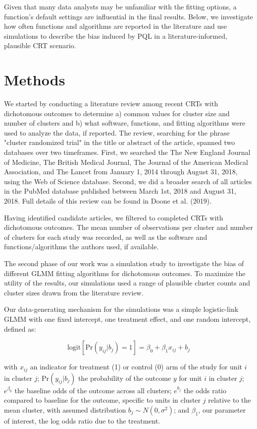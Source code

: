 \documentclass{article}
\begin{document}
\begin{flushleft}
Given that many data analysts may be unfamiliar with the fitting options, a function's default settings are influential in the final results. Below, we investigate how often functions and algorithms are reported in the literature and use simulations to describe the bias induced by PQL in a literature-informed, plausible CRT scenario.




\section{Methods}

We started by conducting a literature review among recent CRTs with dichotomous outcomes to determine a) common values for cluster size and number of clusters and b) what software, functions, and fitting algorithms were used to analyze the data, if reported. The review, searching for the phrase "cluster randomized trial" in the title or abstract of the article, spanned two databases over two timeframes. First, we searched the The New England Journal of Medicine, The British Medical Journal, The Journal of the American Medical Association, and The Lancet from January 1, 2014 through August 31, 2018, using the Web of Science database. Second, we did a broader search of all articles in the PubMed database published between March 1st, 2018 and August 31, 2018. Full details of this review can be found in Doone et al. (2019).

Having identified candidate articles, we filtered to completed CRTs with dichotomous outcomes. The mean number of observations per cluster and number of clusters for each study was recorded, as well as the software and functions/algorithms the authors used, if available.

The second phase of our work was a simulation study to investigate the bias of different GLMM fitting algorithms for dichotomous outcomes. To maximize the utility of the results, our simulations used a range of plausible cluster counts and cluster sizes drawn from the literature review.

Our data-generating mechanism for the simulations was a simple logistic-link GLMM with one fixed intercept, one treatment effect, and one random intercept, defined as:

\begin{equation}
    \text{logit}[\text{Pr}(y_{ij}|b_j)=1]=\beta_0 + \beta_1 x_{ij} + b_j
\end{equation}

with $x_{ij}$ an indicator for treatment (1) or control (0) arm of the study for unit $i$ in cluster $j$; $\text{Pr}(y_{ij}|b_j)$ the probability of the outcome $y$ for unit $i$ in cluster $j$; $e^{\beta_0}$ the baseline odds of the outcome across all clusters; $e^{b_j}$ the odds ratio compared to baseline for the outcome, specific to units in cluster $j$ relative to the mean cluster, with assumed distribution $b_j \sim N(0, \sigma^2)$; and $\beta_1$, our parameter of interest, the log odds ratio due to the treatment. 


\end{flushleft}
\end{document}
